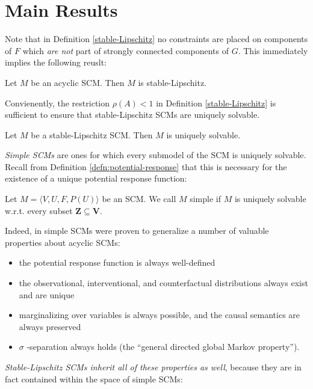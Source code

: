 \documentclass[12pt]{article}
\begin{document}
\section{Main Results}\label{main}

Note that in Definition \ref{stable-Lipschitz} no constraints are placed on components of $F$ which \emph{are not} part of strongly connected components of $G$. This immediately implies the following reuslt:

\begin{theorem} \label{acyclic-subset}
Let $M$ be an acyclic SCM. Then $M$ is stable-Lipschitz.
\end{theorem}

Convienently, the restriction $\rho(A)<1$ in Definition \ref{stable-Lipschitz} is sufficient to ensure that stable-Lipschitz SCMs are uniquely solvable.

\begin{lemma} \label{unique-solvable}
Let $M$ be a stable-Lipschitz SCM. Then $M$ is uniquely solvable.
\end{lemma}

\emph{Simple SCMs} are ones for which every submodel of the SCM is uniquely solvable. Recall from Definition \ref{defn:potential-response} that this is necessary for the existence of a unique potential response function:

\begin{definition}
Let $M=\langle V,U,F,P(U)\rangle$ be an SCM. 
We call $M$ simple if $M$ is uniquely solvable w.r.t. every subset $\mathbf{Z}\subseteq\mathbf{V}$.
\end{definition}

Indeed, in \cite{Foundations} simple SCMs were proven to generalize a number of valuable properties about acyclic SCMs: 
\begin{itemize}
  \item the potential response function is always well-defined
  \item the observational, interventional, and counterfactual distributions always exist and are unique
  \item marginalizing over variables is always possible, and the causal semantics are always preserved
  \item $\sigma$ -separation always holds (the “general directed global Markov property”).
\end{itemize}

\emph{Stable-Lipschitz SCMs inherit all of these properties as well}, because they are in fact contained within the space of simple SCMs:
\end{document}
